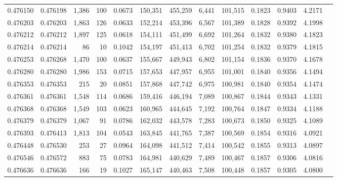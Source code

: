 \begin{tabular}{rrrrrrrrrrrrr}
0.476150 & 0.476198 & 1,386 &   100 &                                     0.0673 & 150,351 & 455,259 &   6,441 & 101,515 & 0.1823 & 0.9403 & 4.2171 \\
0.476203 & 0.476203 & 1,863 &   126 &                                     0.0633 & 152,214 & 453,396 &   6,567 & 101,389 & 0.1828 & 0.9392 & 4.1998 \\
0.476212 & 0.476212 & 1,897 &   125 &                                     0.0618 & 154,111 & 451,499 &   6,692 & 101,264 & 0.1832 & 0.9380 & 4.1823 \\
0.476214 & 0.476214 &    86 &    10 &                                     0.1042 & 154,197 & 451,413 &   6,702 & 101,254 & 0.1832 & 0.9379 & 4.1815 \\
0.476253 & 0.476268 & 1,470 &   100 &                                     0.0637 & 155,667 & 449,943 &   6,802 & 101,154 & 0.1836 & 0.9370 & 4.1678 \\
0.476280 & 0.476280 & 1,986 &   153 &                                     0.0715 & 157,653 & 447,957 &   6,955 & 101,001 & 0.1840 & 0.9356 & 4.1494 \\
0.476353 & 0.476353 &   215 &    20 &                                     0.0851 & 157,868 & 447,742 &   6,975 & 100,981 & 0.1840 & 0.9354 & 4.1474 \\
0.476361 & 0.476361 & 1,548 &   114 &                                     0.0686 & 159,416 & 446,194 &   7,089 & 100,867 & 0.1844 & 0.9343 & 4.1331 \\
0.476368 & 0.476368 & 1,549 &   103 &                                     0.0623 & 160,965 & 444,645 &   7,192 & 100,764 & 0.1847 & 0.9334 & 4.1188 \\
0.476379 & 0.476379 & 1,067 &    91 &                                     0.0786 & 162,032 & 443,578 &   7,283 & 100,673 & 0.1850 & 0.9325 & 4.1089 \\
0.476393 & 0.476413 & 1,813 &   104 &                                     0.0543 & 163,845 & 441,765 &   7,387 & 100,569 & 0.1854 & 0.9316 & 4.0921 \\
0.476448 & 0.476530 &   253 &    27 &                                     0.0964 & 164,098 & 441,512 &   7,414 & 100,542 & 0.1855 & 0.9313 & 4.0897 \\
0.476546 & 0.476572 &   883 &    75 &                                     0.0783 & 164,981 & 440,629 &   7,489 & 100,467 & 0.1857 & 0.9306 & 4.0816 \\
0.476636 & 0.476636 &   166 &    19 &                                     0.1027 & 165,147 & 440,463 &   7,508 & 100,448 & 0.1857 & 0.9305 & 4.0800 \\

\end{tabular}
